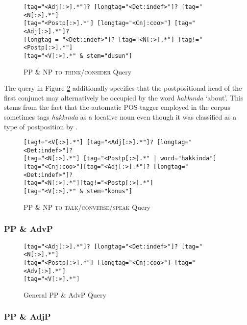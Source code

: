 \begin{figure}[!h]
		\begin{lstlisting}
[tag="<Adj[:>].*"]? [longtag="<Det:indef>"]? [tag="<N[:>].*"]
[tag="<Postp[:>].*"] [longtag="<Cnj:coo>"] [tag="<Adj[:>].*"]?
[longtag = "<Det:indef>"]? [tag="<N[:>].*"] [tag!="<Postp[:>].*"] 
[tag="<V[:>].*" & stem="dusun"]
		\end{lstlisting}
	\caption{PP \& NP \textsc{to think/consider} Query}
	\label{CQl_ppnp-düşünmek}
\end{figure}

The query in Figure \ref{CQl_ppnp-konuşmak} additionally specifies that the postpositional head of the first conjunct may alternatively be occupied by the word \textit{hakkında} `about'. This stems from the fact that the automatic POS-tagger employed in the corpus sometimes tags \textit{hakkında} as a locative noun even though it was classified as a type of postposition by \citet[pp.\ 100--102]{kornfilt97}.

\begin{figure}[!h]
		\begin{lstlisting}
[tag!="<V[:>].*"] [tag="<Adj[:>].*"]? [longtag="<Det:indef>"]?
[tag="<N[:>].*"] [tag="<Postp[:>].*" | word="hakkinda"]
[tag="<Cnj:coo>"][tag="<Adj[:>].*"]? [longtag="<Det:indef>"]?
[tag="<N[:>].*"][tag!="<Postp[:>].*"] 
[tag="<V[:>].*" & stem="konus"]
		\end{lstlisting}
	\caption{PP \& NP \textsc{to talk/converse/speak} Query}
	\label{CQl_ppnp-konuşmak}
\end{figure}

\newpage
\subsubsection{PP \& AdvP}

\begin{figure}[!h]
		\begin{lstlisting}
[tag="<Adj[:>].*"]? [longtag="<Det:indef>"]? [tag="<N[:>].*"]
[tag="<Postp[:>].*"] [longtag="<Cnj:coo>"] [tag="<Adv[:>].*"]
[tag="<V[:>].*"]
		\end{lstlisting}
	\caption{General PP \& AdvP Query}
	\label{CQl_pp-advpgeneral}
\end{figure}

\subsubsection{PP \& AdjP}

